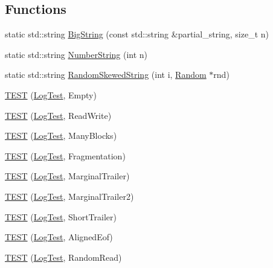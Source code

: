\subsection*{Functions}
\begin{DoxyCompactItemize}
\item 
static std\-::string \hyperlink{namespaceleveldb_1_1log_a211dcbca77b4ff487c70016c09af674e}{Big\-String} (const std\-::string \&partial\-\_\-string, size\-\_\-t n)
\item 
static std\-::string \hyperlink{namespaceleveldb_1_1log_a851536d606f5ecc9857ee45430a23465}{Number\-String} (int n)
\item 
static std\-::string \hyperlink{namespaceleveldb_1_1log_a4f28769ffa840923fea43c6825a6a0e2}{Random\-Skewed\-String} (int i, \hyperlink{classleveldb_1_1_random}{Random} $\ast$rnd)
\item 
\hyperlink{namespaceleveldb_1_1log_ab8a02b9419477420eca51cfd47d5f172}{T\-E\-S\-T} (\hyperlink{classleveldb_1_1log_1_1_log_test}{Log\-Test}, Empty)
\item 
\hyperlink{namespaceleveldb_1_1log_aabca07adceffd87baf38b81665d92bb4}{T\-E\-S\-T} (\hyperlink{classleveldb_1_1log_1_1_log_test}{Log\-Test}, Read\-Write)
\item 
\hyperlink{namespaceleveldb_1_1log_a60249ea325a8656fdc31898d7c5f4ad9}{T\-E\-S\-T} (\hyperlink{classleveldb_1_1log_1_1_log_test}{Log\-Test}, Many\-Blocks)
\item 
\hyperlink{namespaceleveldb_1_1log_ac15e5779ff43d83522727b8cc44882a2}{T\-E\-S\-T} (\hyperlink{classleveldb_1_1log_1_1_log_test}{Log\-Test}, Fragmentation)
\item 
\hyperlink{namespaceleveldb_1_1log_a9721de928c01ac50b5770b8b4cbb98e1}{T\-E\-S\-T} (\hyperlink{classleveldb_1_1log_1_1_log_test}{Log\-Test}, Marginal\-Trailer)
\item 
\hyperlink{namespaceleveldb_1_1log_aad9c4a11c674359115f4d16c97e33ad1}{T\-E\-S\-T} (\hyperlink{classleveldb_1_1log_1_1_log_test}{Log\-Test}, Marginal\-Trailer2)
\item 
\hyperlink{namespaceleveldb_1_1log_a1a1972ff9493353cfb4546cacd33ddb7}{T\-E\-S\-T} (\hyperlink{classleveldb_1_1log_1_1_log_test}{Log\-Test}, Short\-Trailer)
\item 
\hyperlink{namespaceleveldb_1_1log_a55d554f8c576d9d4d99e35d3fe0c169f}{T\-E\-S\-T} (\hyperlink{classleveldb_1_1log_1_1_log_test}{Log\-Test}, Aligned\-Eof)
\item 
\hyperlink{namespaceleveldb_1_1log_a52d33034be964c0d0e40efdf4b423452}{T\-E\-S\-T} (\hyperlink{classleveldb_1_1log_1_1_log_test}{Log\-Test}, Random\-Read)

\end{DoxyCompactItemize}
